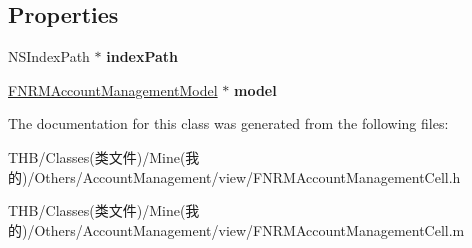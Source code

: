 \subsection*{Properties}
\begin{DoxyCompactItemize}
\item 
\mbox{\label{interface_f_n_r_m_account_management_cell_ac4329e5f0883515ac74386ea41644811}} 
N\+S\+Index\+Path $\ast$ {\bfseries index\+Path}
\item 
\mbox{\label{interface_f_n_r_m_account_management_cell_a8ff24fa3c777ab96a97a0f9e1d3513bc}} 
\mbox{\hyperlink{interface_f_n_r_m_account_management_model}{F\+N\+R\+M\+Account\+Management\+Model}} $\ast$ {\bfseries model}
\end{DoxyCompactItemize}


The documentation for this class was generated from the following files\+:\begin{DoxyCompactItemize}
\item 
T\+H\+B/\+Classes(类文件)/\+Mine(我的)/\+Others/\+Account\+Management/view/F\+N\+R\+M\+Account\+Management\+Cell.\+h\item 
T\+H\+B/\+Classes(类文件)/\+Mine(我的)/\+Others/\+Account\+Management/view/F\+N\+R\+M\+Account\+Management\+Cell.\+m\end{DoxyCompactItemize}
